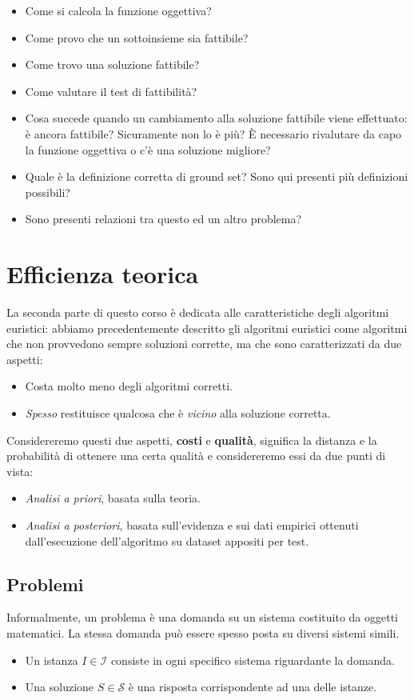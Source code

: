 \documentclass{article}
\begin{document}
\begin{itemize}
    \item Come si calcola la funzione oggettiva?
    \item Come provo che un sottoinsieme sia fattibile?
    \item Come trovo una soluzione fattibile?
    \item Come valutare il test di fattibilità?
    \item Cosa succede quando un cambiamento alla soluzione fattibile viene effettuato: è ancora fattibile?
          Sicuramente non lo è più? È necessario rivalutare da capo la funzione oggettiva o c'è una soluzione migliore?
    \item Quale è la definizione corretta di ground set? Sono qui presenti più definizioni possibili?
    \item Sono presenti relazioni tra questo ed un altro problema?
\end{itemize}

\section{Efficienza teorica}
La seconda parte di questo corso è dedicata alle caratteristiche degli algoritmi euristici: abbiamo precedentemente
descritto gli algoritmi euristici come algoritmi che non provvedono sempre soluzioni corrette, ma che sono
caratterizzati da due aspetti:
\begin{itemize}
    \item Costa molto meno degli algoritmi corretti.
    \item \textit{Spesso} restituisce qualcosa che è \textit{vicino} alla soluzione corretta.
\end{itemize}

Considereremo questi due aspetti, \textbf{costi} e \textbf{qualità}, significa la distanza e la probabilità
di ottenere una certa qualità e considereremo essi da due punti di vista:
\begin{itemize}
    \item \textit{Analisi a priori}, basata sulla teoria.
    \item \textit{Analisi a posteriori}, basata sull'evidenza e sui dati empirici ottenuti dall'esecuzione dell'algoritmo
          su dataset appositi per test.
\end{itemize}

\subsection{Problemi}
Informalmente, un problema è una domanda su un sistema costituito da oggetti matematici. La stessa domanda può
essere spesso posta su diversi sistemi simili.
\begin{itemize}
    \item Un istanza $I\in\mathcal{I}$ consiste in ogni specifico sistema riguardante la domanda.
    \item Una soluzione $S\in\mathcal{S}$ è una risposta corrispondente ad una delle istanze.
\end{itemize}
\end{document}
